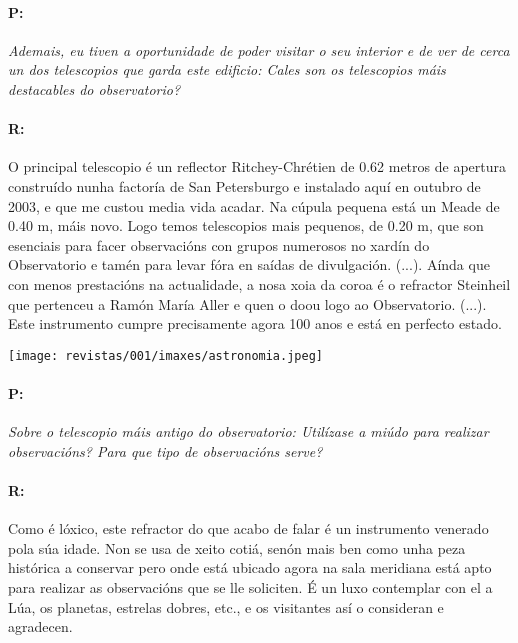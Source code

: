 \begin{multicols}{2}
\paragraph{P:}

\textit{ Ademais, eu tiven a oportunidade de poder visitar o seu interior e de
ver de cerca un dos telescopios que garda este edificio: Cales son os
telescopios máis destacables do observatorio? }

\paragraph{R:}

O principal telescopio é un reflector Ritchey-Chrétien de 0.62 metros de
apertura construído nunha factoría de San Petersburgo e instalado aquí en
outubro de 2003, e que me custou media vida acadar. Na cúpula pequena está un
Meade de 0.40 m, máis novo. Logo temos telescopios mais pequenos, de 0.20 m,
que son esenciais para facer observacións con grupos numerosos no xardín do
Observatorio e tamén para levar fóra en saídas de divulgación. (...). Aínda que
con menos prestacións na actualidade, a nosa xoia da coroa é o refractor
Steinheil que pertenceu a Ramón María Aller e quen o doou logo ao Observatorio.
(...). Este instrumento cumpre precisamente agora 100 anos e está en perfecto
estado.

\begin{center}
    \texttt{[image: revistas/001/imaxes/astronomia.jpeg]}
\end{center}

\paragraph{P:}

\textit{ Sobre o telescopio máis antigo do observatorio: Utilízase a miúdo para
realizar observacións? Para que tipo de observacións serve? }

\paragraph{R:}

Como é lóxico, este refractor do que acabo de falar é un
instrumento venerado pola súa idade. Non se usa de xeito cotiá, senón mais ben
como unha peza histórica a conservar pero onde está ubicado agora na sala
meridiana está apto para realizar as observacións que se lle soliciten. É un
luxo contemplar con el a Lúa, os planetas, estrelas dobres, etc., e os
visitantes así o consideran e  agradecen.


\end{multicols}
